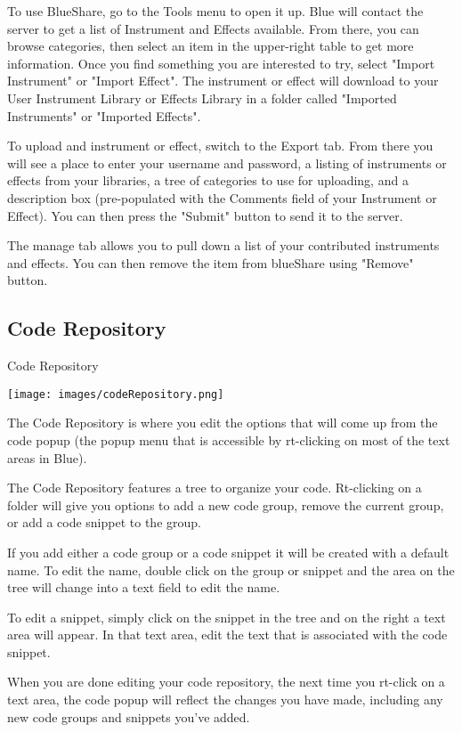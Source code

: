 To use BlueShare, go to the Tools menu to open it up. Blue will contact
the server to get a list of Instrument and Effects available. From
there, you can browse categories, then select an item in the upper-right
table to get more information. Once you find something you are
interested to try, select "Import Instrument" or "Import Effect". The
instrument or effect will download to your User Instrument Library or
Effects Library in a folder called "Imported Instruments" or "Imported
Effects".

To upload and instrument or effect, switch to the Export tab. From there
you will see a place to enter your username and password, a listing of
instruments or effects from your libraries, a tree of categories to use
for uploading, and a description box (pre-populated with the Comments
field of your Instrument or Effect). You can then press the "Submit"
button to send it to the server.

The manage tab allows you to pull down a list of your contributed
instruments and effects. You can then remove the item from blueShare
using "Remove" button.

\subsection{Code Repository}\label{codeRepository}

Code Repository

\texttt{[image: images/codeRepository.png]}

The Code Repository is where you edit the options that will come up from
the code popup (the popup menu that is accessible by rt-clicking on most
of the text areas in Blue).

The Code Repository features a tree to organize your code. Rt-clicking
on a folder will give you options to add a new code group, remove the
current group, or add a code snippet to the group.

If you add either a code group or a code snippet it will be created with
a default name. To edit the name, double click on the group or snippet
and the area on the tree will change into a text field to edit the name.

To edit a snippet, simply click on the snippet in the tree and on the
right a text area will appear. In that text area, edit the text that is
associated with the code snippet.

When you are done editing your code repository, the next time you
rt-click on a text area, the code popup will reflect the changes you
have made, including any new code groups and snippets you've added.

